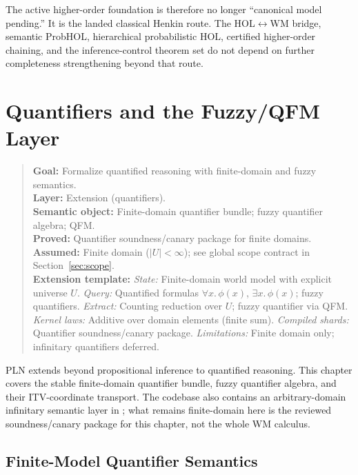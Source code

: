 \documentclass[11pt,openany]{report}
\begin{document}
The active higher-order foundation is therefore no longer ``canonical model
pending.''  It is the landed classical Henkin route.  The
HOL$\leftrightarrow$WM bridge, semantic ProbHOL, hierarchical probabilistic
HOL, certified higher-order chaining, and the inference-control theorem set
do not depend on further completeness strengthening beyond that route.


\chapter{Quantifiers and the Fuzzy/QFM Layer}
\label{ch:quantifiers}

\begin{quote}\small
\textbf{Goal:} Formalize quantified reasoning with finite-domain and fuzzy semantics.\\
\textbf{Layer:} Extension (quantifiers).\\
\textbf{Semantic object:} Finite-domain quantifier bundle; fuzzy quantifier algebra; QFM.\\
\textbf{Proved:} Quantifier soundness/canary package for finite domains.\\
\textbf{Assumed:} Finite domain ($|U| < \infty$); see global scope contract in Section~\ref{sec:scope}.\\[4pt]
\textbf{Extension template:}
\textit{State:} Finite-domain world model with explicit universe $U$.
\textit{Query:} Quantified formulas $\forall x.\, \phi(x)$, $\exists x.\, \phi(x)$; fuzzy quantifiers.
\textit{Extract:} Counting reduction over $U$; fuzzy quantifier via QFM.
\textit{Kernel laws:} Additive over domain elements (finite sum).
\textit{Compiled shards:} Quantifier soundness/canary package.
\textit{Limitations:} Finite domain only; infinitary quantifiers deferred.
\end{quote}

PLN extends beyond propositional inference to quantified reasoning.
This chapter covers the stable finite-domain quantifier bundle, fuzzy
quantifier algebra, and their ITV-coordinate transport.  The codebase
also contains an arbitrary-domain infinitary semantic layer in
; what remains
finite-domain here is the reviewed soundness/canary package for this
chapter, not the whole WM calculus.

\section{Finite-Model Quantifier Semantics}
\end{document}
